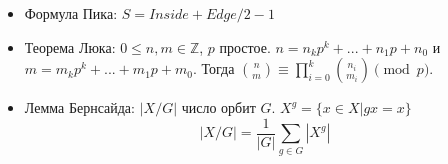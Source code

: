 \begin{itemize}
\setlength\itemsep{0em}
\item Формула Пика: $S=Inside+Edge / 2 - 1$
\item Теорема Люка: $0\leq n,m \in \mathbb{Z}$, $p$ простое. $n=n_kp^k+...+n_1p+n_0$ и $m=m_kp^k+...+m_1p+m_0$. Тогда $\binom{n}{m} \equiv \prod\limits_{i=0}^k\binom{n_i}{m_i} \pmod{p}$.
\item Лемма Бернсайда: $|X/G|$ число орбит $G$. $X^g = \{x\in X | gx=x\}$
$$|X/G|=\frac{1}{|G|}\sum_{g \in G}|X^g|$$
\end{itemize}
